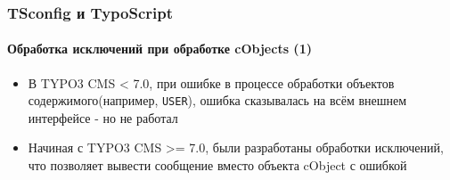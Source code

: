 
\begin{frame}[fragile]
	\frametitle{TSconfig и TypoScript}
	\framesubtitle{Обработка исключений при обработке cObjects (1)}

	\begin{itemize}
		\item В TYPO3 CMS < 7.0, при ошибке в процессе обработки объектов содержимого(например, \texttt{USER}), ошибка
		сказывалась на всём внешнем интерфейсе - но не работал
		\item Начиная с TYPO3 CMS >= 7.0, были разработаны обработки исключений, что позволяет вывести сообщение вместо объекта
		 cObject с ошибкой
	\end{itemize}

%

\end{frame}


